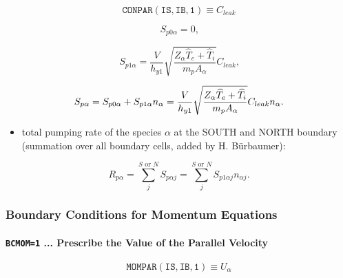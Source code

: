 \documentclass[11pt]{article}
\begin{document}
\bigskip

\begin{equation*}
\mathtt{CONPAR(IS,IB,1)}\equiv C_{leak}
\end{equation*}

\bigskip

\begin{equation}
S_{p0\alpha}=0\text{,}   \label{c60}
\end{equation}

\begin{equation}
S_{p1\alpha}=\frac{V}{h_{y1}}\sqrt{\frac{Z_{\alpha}\widehat{T}_{e}+\widehat
{T}_{i}}{m_{p}A_{\alpha}}}C_{leak}\text{,}   \label{c70}
\end{equation}

\begin{equation}
S_{p\alpha}=S_{p0\alpha}+S_{p1\alpha}n_{\alpha}=\frac{V}{h_{y1}}\sqrt {\frac{%
Z_{\alpha}\widehat{T}_{e}+\widehat{T}_{i}}{m_{p}A_{\alpha}}%
}C_{leak}n_{\alpha}\text{.}   \label{c71}
\end{equation}

\begin{itemize}
\item  total pumping rate of the species $\alpha$ at the SOUTH and NORTH
boundary (summation over all boundary cells, added by H. B\"{u}rbaumer):
\end{itemize}

\begin{equation}
R_{p\alpha}=\sum_{j}^{S\text{ or }N}S_{p\alpha j}=\sum_{j}^{S\text{ or }%
N}S_{p1\alpha j}n_{\alpha j}\text{.}   \label{c72}
\end{equation}

\bigskip

\subsubsection{Boundary Conditions for Momentum Equations}

\bigskip

\paragraph{\texttt{BCMOM=1} ... Prescribe the Value of the Parallel Velocity}

\bigskip

\begin{equation*}
\mathtt{MOMPAR(IS,IB,1)}\equiv U_{\alpha}
\end{equation*}
\end{document}
